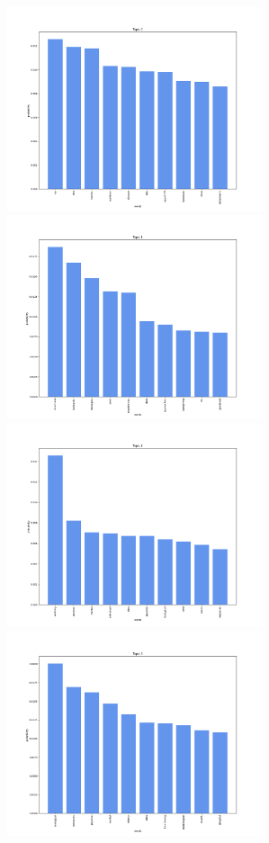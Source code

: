 \documentclass[10pt]{article} %
\begin{document}
	\begin{center}
		\includegraphics[width=7.5cm]{images/plots/test_5_no_stopwords/topic_0.png}
		\includegraphics[width=7.5cm]{images/plots/test_5_no_stopwords/topic_1.png}
		\includegraphics[width=7.5cm]{images/plots/test_5_no_stopwords/topic_2.png}
		\includegraphics[width=7.5cm]{images/plots/test_5_no_stopwords/topic_3.png}\

\end{center}
\end{document}
